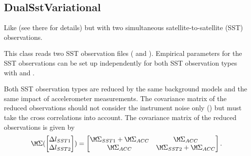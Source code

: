 \subsection{DualSstVariational}\label{observationType:dualSstVariational}
Like  (see there for details)
but with two simultaneous satellite-to-satellite (SST) observations.

This class reads two SST observation files ( and
).
Empirical parameters for the SST observations can be set up independently for both SST observation
types with  and
.

Both SST observation types are reduced by the same background models and the same impact
of accelerometer measurements. The covariance matrix of the reduced observations should not consider
the instrument noise only () but must
take the cross correlations  into account.
The covariance matrix of the reduced observations is given by
\begin{equation}
  \M\Sigma(\begin{bmatrix} \Delta l_{SST1} \\ \Delta l_{SST2} \end{bmatrix})
  = \begin{bmatrix} \M\Sigma_{SST1} + \M\Sigma_{ACC} & \M\Sigma_{ACC} \\
                   \M\Sigma_{ACC} & \M\Sigma_{SST2} + \M\Sigma_{ACC}
    \end{bmatrix}.
\end{equation}

